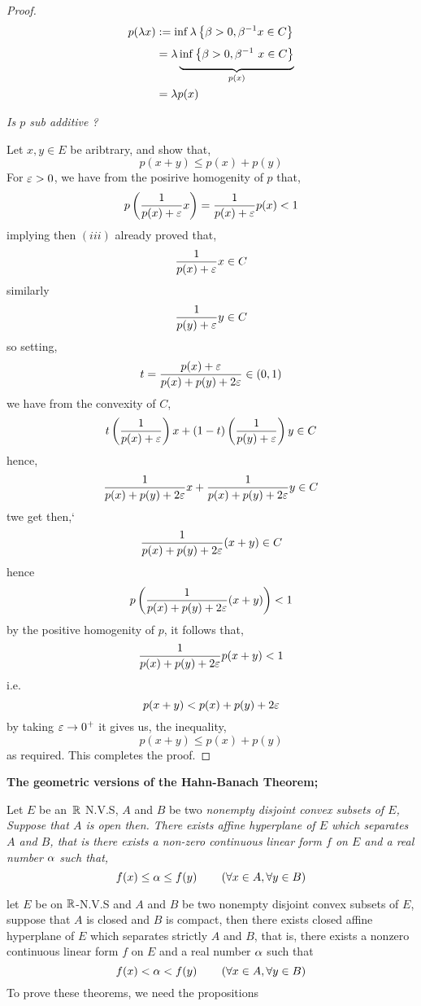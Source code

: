 \begin{proof}
\begin{align*}
	p (\lm x) &:= 
	\inf_{} \lm \left\{ 
		\bb > 0, \bb ^{-1} x \in C
	\right\} \\
		  &= \lm 
		  \underbrace{
		  \inf_{}
		  \left\{ \bb  > 0, 
		  \bb ^{-1} x \in C\right\} 
		  }_{p(x)} 
		  \\
		  &= \lm p(x) 
\end{align*}
\begin{center}
	\it Is $p $ sub additive ? \normalfont
\end{center}
Let $x, y \in E $  be aribtrary, and show that, 
\[
p(x+y)  \leq p(x) + p(y) 
\]
For $\varepsilon  > 0 $, we have from the posirive homogenity 
of $p $ that, 
\[
p \left( 
	\frac{1}{p(x)  + \varepsilon } x
\right) = 
\frac{1}{p(x)  + \varepsilon } p(x)  < 1
\]
implying then $(iii)$ already proved that, 
\[
\frac{1}{p(x) + \varepsilon } x \in  C
\]
similarly 
\[
\frac{1}{p(y) + \varepsilon } y \in  C
\]
so setting, 
\[
t = \frac{p(x)  + \varepsilon }{p(x) + p(y) + 2 \varepsilon } \in  
(0,1) 
\] 
we have from the convexity of $C $, 
\[
t \left( \frac{1}{p(x)  + \varepsilon } \right) x + 
(1-t)  
\left( 
	\frac{1}{p(y)  + \varepsilon } 
\right) y \in  C
\]
hence,
\[
\frac{1}{p(x) + p(y)  + 2\varepsilon  } x + 
\frac{1}{p(x) + p(y)  + 2\varepsilon  } y  \in  C
\]
twe get then,`
\[
\frac{1}{p(x) + p(y) + 2 \varepsilon  } 
(x+y)  \in C
\]
hence 
\[
p \left( 
	\frac{1}{p(x) + p(y) + 2 \varepsilon } (x+y) 
\right) <  1
\]
by the positive homogenity of $p $, it follows that, 
\[
\frac{1}{p(x) + p (y) + 2 \varepsilon } 
p(x+y)  <  1
\]
i.e. 
\[
p(x+y) <  p(x) + p(y) + 2 \varepsilon 
\] 
by taking $\varepsilon  \rightarrow 0^{+} $ it gives us, the inequality, 
\[
p(x+y)  \leq p(x) + p(y) 
\]
as required. This completes the proof.
\end{proof}
\begin{center}
	\textbf{
The geometric versions of the Hahn-Banach Theorem;
	}
\end{center}
\begin{theorem} 
	Let $E $ be an $\mathbb{R}  $ N.V.S, $A $ and $B $  be two \it nonempty
	disjoint convex \normalfont subsets of $E$, Suppose that $A $ is open
	then. There exists affine hyperplane of $E$ which separates $A $ and
	$B $, that is there exists a non-zero continuous  
	linear form $f $ on $E $ and a real number $\alpha $ such that, 
	\[
	f(x) \leq \alpha \leq f(y) \quad \quad 
	\left( 
		\forall  x \in  A,
		\forall y \in  B
	\right)
	\] 
\end{theorem}
\begin{theorem} 
	let $E $ be on $\mathbb{R} $-N.V.S and $A $ and $B $ be two nonempty 
	disjoint convex subsets of $E$, suppose that $A$ is closed 
	and $B $ is compact, then there exists closed affine hyperplane 
	of $E $ which separates strictly $A $ and $B $, that is, 
	there exists a nonzero continuous linear form $f $ on $E $ 
	and a real number $\alpha$ such that 
	\[
	f(x)  <  \alpha <  f(y) \quad  \quad 
	\left( 
		\forall x \in  A, \forall y \in  B
	\right)
	\] 
	To prove these theorems, we need the propositions
\end{theorem} 
